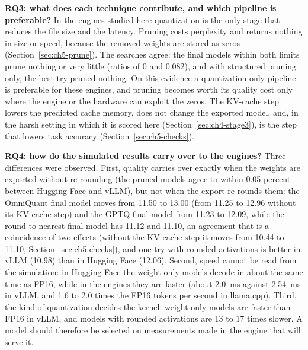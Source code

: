 \documentclass[
11pt, %
english, %
singlespacing, %
headsepline, %
]{MastersDoctoralThesis} %
\begin{document}
\textbf{RQ3: what does each technique contribute, and which pipeline is preferable?} In the engines studied here quantization is the only stage that reduces the file size and the latency. Pruning costs perplexity and returns nothing in size or speed, because the removed weights are stored as zeros (Section~\ref{sec:ch5-prune}). The searches agree: the final models within both limits prune nothing or very little (ratios of 0 and 0.082), and with structured pruning only, the best try pruned nothing. On this evidence a quantization-only pipeline is preferable for these engines, and pruning becomes worth its quality cost only where the engine or the hardware can exploit the zeros. The KV-cache step lowers the predicted cache memory, does not change the exported model, and, in the harsh setting in which it is scored here (Section~\ref{sec:ch4-stage3}), is the step that lowers task accuracy (Section~\ref{sec:ch5-checks}).

\textbf{RQ4: how do the simulated results carry over to the engines?} Three differences were observed. First, quality carries over exactly when the weights are exported without re-rounding (the pruned models agree to within 0.05 percent between Hugging Face and vLLM), but not when the export re-rounds them: the OmniQuant final model moves from 11.50 to 13.00 (from 11.25 to 12.96 without its KV-cache step) and the GPTQ final model from 11.23 to 12.09, while the round-to-nearest final model has 11.12 and 11.10, an agreement that is a coincidence of two effects (without the KV-cache step it moves from 10.44 to 11.10, Section~\ref{sec:ch5-checks}), and one try with rounded activations is better in vLLM (10.98) than in Hugging Face (12.06). Second, speed cannot be read from the simulation: in Hugging Face the weight-only models decode in about the same time as FP16, while in the engines they are faster (about 2.0~ms against 2.54~ms in vLLM, and 1.6 to 2.0 times the FP16 tokens per second in llama.cpp). Third, the kind of quantization decides the kernel: weight-only models are faster than FP16 in vLLM, and models with rounded activations are 13 to 17 times slower. A model should therefore be selected on measurements made in the engine that will serve it.
\end{document}
